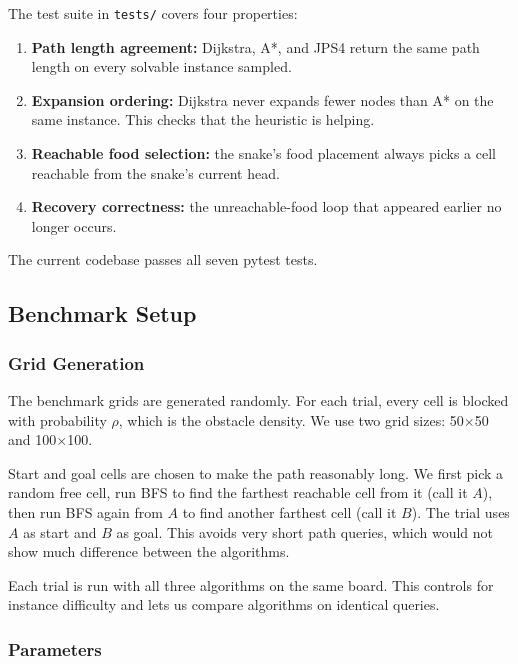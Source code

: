 \documentclass[11pt,a4paper]{article}
\begin{document}
The test suite in \texttt{tests/} covers four properties:

\begin{enumerate}[nosep]
  \item \textbf{Path length agreement:} Dijkstra, A*, and JPS4 return the same path length on every solvable instance sampled.
  \item \textbf{Expansion ordering:} Dijkstra never expands fewer nodes than A* on the same instance. This checks that the heuristic is helping.
  \item \textbf{Reachable food selection:} the snake's food placement always picks a cell reachable from the snake's current head.
  \item \textbf{Recovery correctness:} the unreachable-food loop that appeared earlier no longer occurs.
\end{enumerate}

The current codebase passes all seven pytest tests.

\subsection{Benchmark Setup}

\subsubsection{Grid Generation}

The benchmark grids are generated randomly. For each trial, every cell is blocked with probability $\rho$, which is the obstacle density. We use two grid sizes: 50$\times$50 and 100$\times$100.

Start and goal cells are chosen to make the path reasonably long. We first pick a random free cell, run BFS to find the farthest reachable cell from it (call it $A$), then run BFS again from $A$ to find another farthest cell (call it $B$). The trial uses $A$ as start and $B$ as goal. This avoids very short path queries, which would not show much difference between the algorithms.

Each trial is run with all three algorithms on the same board. This controls for instance difficulty and lets us compare algorithms on identical queries.

\subsubsection{Parameters}
\end{document}

